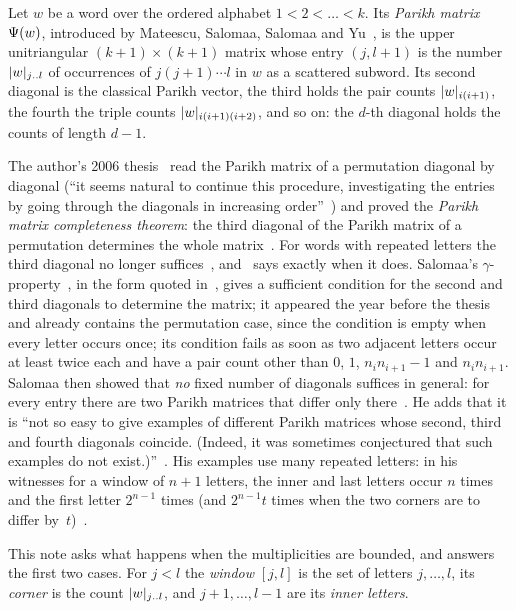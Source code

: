 \documentclass[11pt,a4paper]{article}
\begin{document}
Let $w$ be a word over the ordered alphabet $1<2<\dots<k$. Its \emph{Parikh matrix} $\Psi(w)$, introduced by Mateescu, Salomaa, Salomaa and Yu~\cite{MSSY01}, is the upper unitriangular $(k+1)\times(k+1)$ matrix whose entry $(j,l+1)$ is the number $\lvert w\rvert_{j\mathinner{\ldotp\ldotp} l}$ of occurrences of $j(j+1)\cdots l$ in $w$ as a scattered subword. Its second diagonal is the classical Parikh vector, the third holds the pair counts $\lvert w\rvert_{i(i+1)}$, the fourth the triple counts $\lvert w\rvert_{i(i+1)(i+2)}$, and so on: the $d$-th diagonal holds the counts of length $d-1$.

The author's 2006 thesis~\cite{Yamba06} read the Parikh matrix of a permutation diagonal by diagonal (``it seems natural to continue this procedure, investigating the entries by going through the diagonals in increasing order''~\cite[]{Yamba06}) and proved the \emph{Parikh matrix completeness theorem}: the third diagonal of the Parikh matrix of a permutation determines the whole matrix~\cite[Theorem~3.5, ]{Yamba06}. For words with repeated letters the third diagonal no longer suffices~\cite[p.~226]{Sal06}, and~\cite[Theorem~A]{Y26b} says exactly when it does. Salomaa's $\gamma$-property~\cite{Sal05i}, in the form quoted in~\cite[Theorem~3, p.~226]{Sal06}, gives a sufficient condition for the second and third diagonals to determine the matrix; it appeared the year before the thesis and already contains the permutation case, since the condition is empty when every letter occurs once; its condition fails as soon as two adjacent letters occur at least twice each and have a pair count other than $0$, $1$, $n_in_{i+1}-1$ and $n_in_{i+1}$. Salomaa then showed that \emph{no} fixed number of diagonals suffices in general: for every entry there are two Parikh matrices that differ only there~\cite[Theorem~4, p.~228]{Sal06}. He adds that it is ``not so easy to give examples of different Parikh matrices whose second, third and fourth diagonals coincide. (Indeed, it was sometimes conjectured that such examples do not exist.)''~\cite[p.~228]{Sal06}. His examples use many repeated letters: in his witnesses for a window of $n+1$ letters, the inner and last letters occur $n$ times and the first letter $2^{n-1}$ times (and $2^{n-1}t$ times when the two corners are to differ by~$t$)~\cite[Lemma~3, p.~227, and proof of Theorem~4]{Sal06}.

This note asks what happens when the multiplicities are bounded, and answers the first two cases. For $j<l$ the \emph{window} $[j,l]$ is the set of letters $j,\dots,l$, its \emph{corner} is the count $\lvert w\rvert_{j\mathinner{\ldotp\ldotp} l}$, and $j+1,\dots,l-1$ are its \emph{inner letters}.
\end{document}
